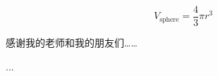 \documentclass[lang=chs, degree=master, blindreview=false, adobe=false]{yanputhesis}
\begin{document}
\begin{equation}
    V_{\text{sphere}} = \frac43 \pi r^3
\end{equation}

\cleardoublepage
\backmatter                                                 %
\begin{acknowledgements}                                    %
    感谢我的老师和我的朋友们……
\end{acknowledgements}                                      %
\begin{accomplishments}                                     %
    [1] ...
\end{accomplishments}                                       %
\makestatement                                              %
\end{document}
